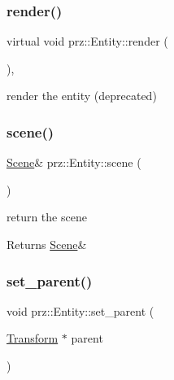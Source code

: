 \subsubsection{\texorpdfstring{render()}{render()}}
{\footnotesize\ttfamily virtual void prz\+::\+Entity\+::render (\begin{DoxyParamCaption}{ }\end{DoxyParamCaption})\hspace{0.3cm}{\ttfamily [inline]}, {\ttfamily [virtual]}}



render the entity (deprecated) 

\mbox{\label{classprz_1_1_entity_abc93c872fbda2dff6c205a8aeac9d96e}} 
\subsubsection{\texorpdfstring{scene()}{scene()}}
{\footnotesize\ttfamily \mbox{\hyperlink{classprz_1_1_scene}{Scene}}\& prz\+::\+Entity\+::scene (\begin{DoxyParamCaption}{ }\end{DoxyParamCaption})\hspace{0.3cm}{\ttfamily [inline]}}



return the scene 

\begin{DoxyReturn}{Returns}
\mbox{\hyperlink{classprz_1_1_scene}{Scene}}\& 
\end{DoxyReturn}
\mbox{\label{classprz_1_1_entity_a78044944c6e3e9699a1f685ff6345d39}} 
\subsubsection{\texorpdfstring{set\_parent()}{set\_parent()}\hspace{0.1cm}{\footnotesize\ttfamily [1/2]}}
{\footnotesize\ttfamily void prz\+::\+Entity\+::set\+\_\+parent (\begin{DoxyParamCaption}\item[{\mbox{\hyperlink{classprz_1_1_transform}{Transform}} $\ast$}]{parent }\end{DoxyParamCaption})\hspace{0.3cm}{\ttfamily [inline]}}



